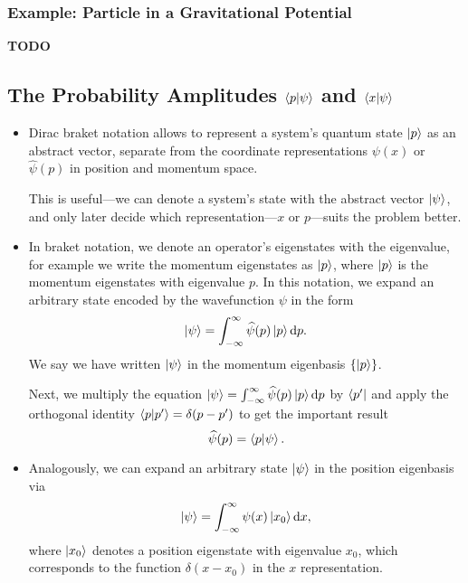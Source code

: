 \documentclass[11pt, a4paper]{article}
\newcommand{\diff}{\mathop{}\!\mathrm{d}} %
\newcommand{\F}[1]{\widehat{#1}} %
\newcommand{\p}{\psi}  %
\begin{document}
\subsubsection{Example: Particle in a Gravitational Potential}
\textbf{TODO}

\subsection{The Probability Amplitudes $ \braket{p}{\psi} $ and $ \braket{x}{\psi} $}
\begin{itemize}
    \item Dirac braket notation allows to represent a system's quantum state $ \ket{p} $ as an abstract vector, separate from the coordinate representations $ \psi(x) $ or $ \F{\p}(p) $ in position and momentum space.

    This is useful---we can denote a system's state with the abstract vector $ \ket{\psi} $, and only later decide which representation---$ x $ or $ p $---suits the problem better.

    \item In braket notation, we denote an operator's eigenstates with the eigenvalue, for example we write the momentum eigenstates as $ \ket{p} $, where $ \ket{p} $ is the momentum eigenstates with eigenvalue $ p $. In this notation, we expand an arbitrary state encoded by the wavefunction $ \psi $ in the form
    \begin{equation*}
        \ket{\psi} = \int_{-\infty}^{\infty}\F{\psi}(p)\ket{p}\diff p.
    \end{equation*}
    We say we have written $ \ket{\psi} $ in the momentum eigenbasis $ \{\ket{p}\} $. 

    Next, we multiply the equation $ \ket{\psi} = \int_{-\infty}^{\infty}\F{\psi}(p)\ket{p}\diff p $ by $ \bra{p'} $ and apply the orthogonal identity $ \braket{p}{p'} = \delta(p - p') $ to get the important result
    \begin{equation*}
        \F{\psi}(p) = \braket{p}{\psi}.
    \end{equation*}
    
    \item Analogously, we can expand an arbitrary state $ \ket{\psi} $ in the position eigenbasis via
    \begin{equation*}
        \ket{\psi} = \int_{-\infty}^{\infty}\psi(x) \ket{x_{0}} \diff x,
    \end{equation*}
    where $ \ket{x_{0}} $ denotes a position eigenstate with eigenvalue $ x_{0} $, which corresponds to the function $ \delta(x - x_{0}) $ in the $ x $ representation. 


\end{itemize}
\end{document}
